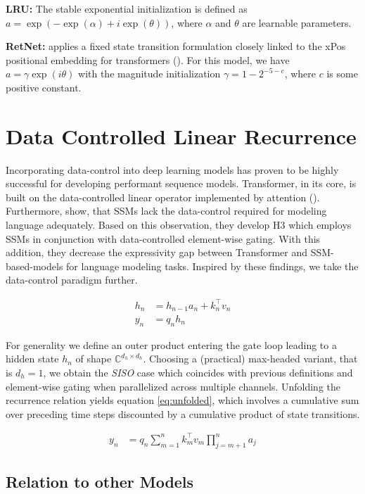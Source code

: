 \textbf{LRU:} The stable exponential initialization is defined as \( a = \exp(-\exp(\alpha) + i\exp(\theta)) \), where \( \alpha \) and \( \theta \) are learnable parameters. 

\textbf{RetNet:} \cite{sun2023retentive} applies a fixed state transition formulation closely linked to the xPos positional embedding for transformers (\cite{sun2022lengthextrapolatable}). For this model, we have \( a = \gamma \exp(i \theta) \) with the magnitude initialization \( \gamma = 1 - 2^{-5-c} \), where \( c \) is some positive constant.

\section{Data Controlled Linear Recurrence} Incorporating data-control into deep learning models has proven to be highly successful for developing performant sequence models. Transformer, in its core, is built on the data-controlled linear operator implemented by attention (\cite{massaroli2021dissecting}). Furthermore, \cite{fu2023hungry} show, that SSMs lack the data-control required for modeling language adequately. Based on this observation, they develop H3 which employs SSMs in conjunction with data-controlled element-wise gating. With this addition, they decrease the expressivity gap between Transformer and SSM-based-models for language modeling tasks. Inspired by these findings, we take the data-control paradigm further.

\begin{align}\label{eq:glr}
h_n &= h_{n-1} a_n + k_n^{\top} v_n \\
y_n &= q_n h_n 
\end{align}

For generality we define an outer product entering the gate loop leading to a hidden state $h_n$ of shape $\mathbb{C}^{d_h \times d_h}$. Choosing a (practical) max-headed variant, that is $d_h = 1$, we obtain the \textit{SISO} case which coincides with previous definitions and element-wise gating when parallelized across multiple channels. Unfolding the recurrence relation yields equation \ref{eq:unfolded}, which involves a cumulative sum over preceding time steps discounted by a cumulative product of state transitions.

\begin{align} \label{eq:unfolded}
y_n &= q_n \sum_{m=1}^{n} k_m^\top v_m \prod_{j=m+1}^{n} a_j
\end{align}

\subsection{Relation to other Models}

